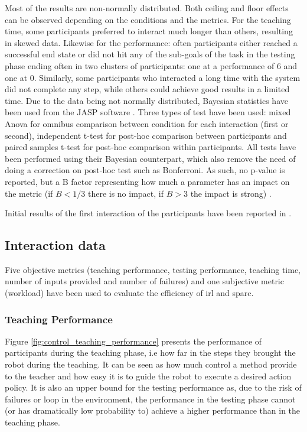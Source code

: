 Most of the results are non-normally distributed. Both ceiling and floor effects can be observed depending on the conditions and the metrics. For the teaching time, some participants preferred to interact much longer than others, resulting in skewed data. Likewise for the performance: often participants either reached a successful end state or did not hit any of the sub-goals of the task in the testing phase ending often in two clusters of participants: one at a performance of 6 and one at 0.  Similarly, some participants who interacted a long time with the system did not complete any step, while others could achieve good results in a limited time. Due to the data being not normally distributed, Bayesian statistics have been used from the JASP software \citep{jasp2018}. Three types of test have been used: mixed Anova for omnibus comparison between condition for each interaction (first or second), independent t-test for post-hoc comparison between participants and paired samples t-test for post-hoc comparison within participants. All tests have been performed using their Bayesian counterpart, which also remove the need of doing a correction on post-hoc test such as Bonferroni. As such, no p-value is reported, but a B factor representing how much a parameter has an impact on the metric (if $B < 1/3$ there is no impact, if $B > 3$ the impact is strong) \citep{dienes2011bayesian,jeffreys1998theory}.

Initial results of the first interaction of the participants have been reported in \cite{senft2016providing}.


\subsection{Interaction data}

Five objective metrics (teaching performance, testing performance, teaching time, number of inputs provided and number of failures) and one subjective metric (workload) have been used to evaluate the efficiency of \gls{irl} and \gls{sparc}. 

\subsubsection{Teaching Performance}

Figure \ref{fig:control_teaching_performance} presents the performance of participants during the teaching phase, i.e how far in the steps they brought the robot during the teaching. It can be seen as how much control a method provide to the teacher and how easy it is to guide the robot to execute a desired action policy. It is also an upper bound for the testing performance as, due to the risk of failures or loop in the environment, the performance in the testing phase cannot (or has dramatically low probability to) achieve a higher performance than in the teaching phase.

